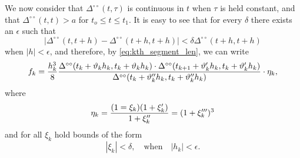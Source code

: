 \documentclass[11pt]{book} \usepackage{amssymb}
\begin{document}
We now consider that $\Delta^{\circ\circ}(t,\tau)$ is continuous in $t$ when
$\tau$ is held constant, and that $\Delta^{\circ\circ}(t,t) > a$ for 
$t_o\leq t\leq t_1$. It is easy to see that for every $\delta$ there exists
an $\epsilon$ such that
\begin{equation}
  \label{eq:delta_bound}
  |\Delta^{\circ\circ}(t,t+h)-\Delta^{\circ\circ}(t+h,t+h)|
  < \delta\Delta^{\circ\circ}(t+h,t+h)
\end{equation}
when $|h|<\epsilon$, and therefore, by \eqref{eq:kth_segment_len}, we can write
\begin{equation}
  \label{eq:kth_segment_len2}
  f_k={h_k^3\over 8}
  {\Delta^{\circ\circ}(t_k+\vartheta_kh_k, t_k+\vartheta_kh_k)
    \cdot \Delta^{\circ\circ}(t_{k+1}+\vartheta'_kh_k, t_k+\vartheta'_kh_k)
    \over 
    \Delta^{\circ\circ}(t_k+\vartheta''_kh_k, t_k+\vartheta''_kh_k)
  }\cdot \eta_k,
\end{equation}
where 
\begin{equation}
  \label{eq:eta_k_def}
  \eta_k={(1=\xi_k)(1+\xi'_k)\over 1+\xi''_k}=(1+\xi'''_k)^3
\end{equation}
and for all $\xi_k$ hold bounds of the form
\begin{equation}
  \label{eq:xi_bounds}
  |\xi_k|<\delta, \quad \mathrm{when} \quad |h_k|<\epsilon.
\end{equation}



 
\end{document}
